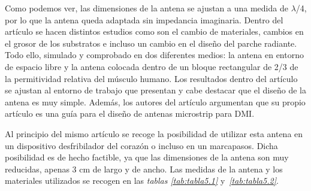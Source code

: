 Como podemos ver, las dimensiones de la antena se ajustan a una medida de $\lambda$/4, por lo que la antena queda adaptada sin impedancia imaginaria. Dentro del artículo se hacen distintos estudios como son el cambio de materiales, cambios en el grosor de los substratos e incluso un cambio en el diseño del parche radiante. Todo ello, simulado y comprobado en dos diferentes medios: la antena en entorno de espacio libre y la antena colocada dentro de un bloque rectangular de 2/3 de la permitividad relativa del músculo humano. Los resultados dentro del artículo se ajustan al entorno de trabajo que presentan y cabe destacar que el diseño de la antena es muy simple. Además, los autores del artículo argumentan que su propio artículo es una guía para el diseño de antenas microstrip para DMI.

Al principio del mismo artículo se recoge la posibilidad de utilizar esta antena en un dispositivo desfribilador del corazón o incluso en un marcapasos. Dicha posibilidad es de hecho factible, ya que las dimensiones de la antena son muy reducidas, apenas 3 cm de largo y de ancho. Las medidas de la antena y los materiales utilizados se recogen en las \textit{tablas \ref{tab:tabla5.1}} y~\textit{\ref{tab:tabla5.2}}.


\begin{table}[h]
    \centering{}
    \caption{Dimensiones originales de la antena de serpentina del artículo de Soontornpipit.}
    \label{tab:tabla5.1}
\end{table}


